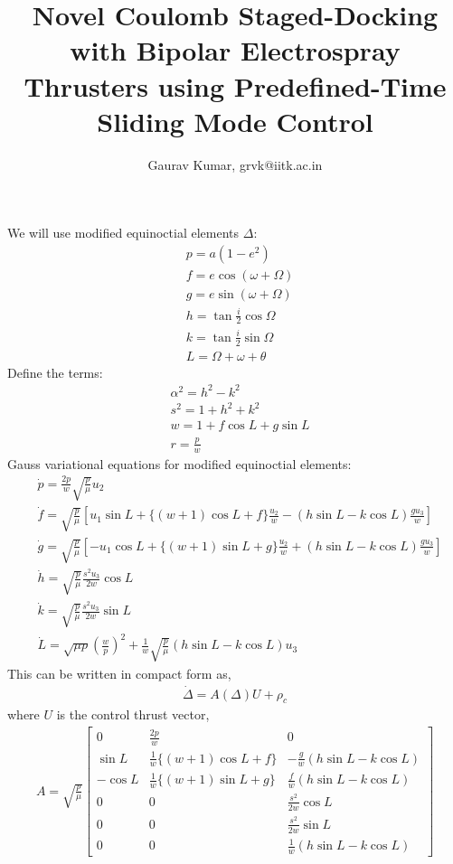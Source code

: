 \documentclass[]{article}
\title{Novel Coulomb Staged-Docking with Bipolar Electrospray Thrusters using Predefined-Time Sliding Mode Control
	}
\author{Gaurav Kumar, grvk@iitk.ac.in}
\theoremstyle{remark}
\theoremstyle{definition}
\begin{document}
	\maketitle
	We will use modified equinoctial elements $\Delta$:
	\begin{align}
		&p = a(1-e^2)\\
		&f = e\cos{(\omega+ \Omega)} \\
		&g = e\sin{(\omega+\Omega)} \\
		&h= \tan{\frac{i}{2}}\cos{\Omega}\\
		&k = \tan{\frac{i}{2}}\sin{\Omega}\\
		&L = \Omega+\omega+\theta
	\end{align}
	Define the terms:
	\begin{align}
		&\alpha^2 = h^2-k^2\\
		&s^2 = 1 + h^2 + k^2\\
		&w = 1 + f\cos{L} + g\sin{L}\\
		&r = \frac{p}{w}
	\end{align}
	Gauss variational equations for modified equinoctial elements: 
	\begin{align}
		&\dot p = \frac{2p}{w}\sqrt{\frac{p}{\mu}} u_2\\
		&\dot f = \sqrt{\frac{p}{\mu}}\left[u_1\sin{L} + \{(w+1)\cos{L} + f\}\frac{u_2}{w} - (h\sin{L} - k\cos{L})\frac{gu_3}{w} \right]\\
		&\dot g = \sqrt{\frac{p}{\mu}}\left[-u_1\cos{L} + \{(w+1)\sin{L} + g\}\frac{u_2}{w} + (h\sin{L} - k\cos{L})\frac{gu_3}{w} \right]\\ 
		&\dot h = \sqrt{\frac{p}{\mu}}\frac{s^2u_3}{2w}\cos{L}\\
		&\dot k = \sqrt{\frac{p}{\mu}}\frac{s^2u_3}{2w}\sin{L}\\
		&\dot L = 
		\sqrt{\mu p}\left(\frac{w}{p}\right)^2 + \frac{1}{w}\sqrt{\frac{p}{\mu}}(h\sin{L}-k\cos{L})u_3
	\end{align}
	This can be written in compact form as,
	\begin{align}
		\dot \Delta = A(\Delta)U + \rho_c
	\end{align}
	where $U$ is the control thrust vector, 
	\begin{align}
		A = \sqrt{\frac{p}{\mu}}\begin{bmatrix} 0 & \frac{2p}{w} & 0\\ \sin{L} &\frac{1 }{w}\{(w+1)\cos{L} + f\} & -\frac{g}{w}(h\sin{L} - k\cos{L}) \\
			-\cos{L} & \frac{1}{w}\{(w+1)\sin{L} + g\} & \frac{f}{w}(h\sin{L} - k\cos{L}) \\
			0 & 0& \frac{s^2}{2w}\cos{L}\\
			0 & 0 & \frac{s^2}{2w}\sin{L} \\
			0 & 0 & \frac{1}{w}(h\sin{L}-k\cos{L})
		\end{bmatrix}
	\end{align}
\end{document}
